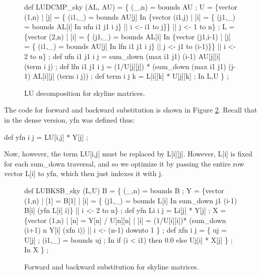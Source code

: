 \begin{figure}[htbp]
 \hdivider
\begin{idenv}
def LUDCMP\_sky (AL, AU) =
    \{ (\_,n) = bounds AU ;
\null
      U = \{vector (1,n)
           | [j] = \{ (i1,\_) = bounds  AU[j]
                    In
                      \{vector (i1,j)
                       | [i] = \{ (j1,\_) = bounds  AL[i]
                                In
                                  ufn i1 j1 i j\}       || i <- i1 to j\}\}
                                                          || j <- 1 to n\} ;
\null
      L = \{vector (2,n)
           | [i] = \{ (j1,\_) = bounds  AL[i]
                    In
                      \{vector (j1,i-1)
                       | [j] = \{ (i1,\_) = bounds  AU[j]
                                In
                                  lfn i1 j1 i j\}       || j <- j1 to (i-1)\}\}
                                                          || i <- 2 to n\} ;
\null
      def ufn i1 j1 i j = sum\_down  (max i1 j1)  (i-1)  AU[j][i]  (term i j) ;
\null
      def lfn i1 j1 i j = (1/U[j][j]) *
                          (sum\_down  (max i1 j1)  (j-1)  AL[i][j]  (term i j)) ;
\null
      def term i j k = L[i][k] * U[j][k] ;
    In
      L,U \} ;
\end{idenv}
 \caption{%
    \label{ludcmp-sky-program}
    LU decomposition for skyline matrices.
         }
 \hdivider
\end{figure}

The code for forward and backward substitution is shown in Figure
\ref{lubksb-sky-program}. Recall that in the dense version, {\cf yfn} was defined thus:

\beginid
    def yfn i j = LU[i,j] * Y[j] ;
\endid

Now, however, the term {\cf LU[i,j]} must be replaced by {\cf
L[i][j]}.  However, {\cf L[i]} is fixed for each {\cf sum\_down}
traversal, and so we optimize it by passing the entire row vector {\cf
L[i]} to {\cf yfn}, which then just indexes it with {\cf j}.

\begin{figure}[htbp]
 \hdivider
\begin{idenv}
def LUBKSB\_sky (L,U) B =
  \{ (\_,n) = bounds B ;
\null
    Y = \{vector (1,n)
         | [1] = B[1]
         | [i] = \{ (j1,\_) = bounds  L[i]
                  In
                    sum\_down j1 (i-1) B[i] (yfn L[i] i)\} || i <- 2 to n\} ;
\null
    def yfn Li i j = Li[j] * Y[j] ;
\null
    X = \{vector (1,n)
         | [n] = Y[n]  / U[n][n]
         | [i] = (1/U[i][i])*
                 (sum\_down (i+1) n Y[i] (xfn i)) || i <- (n-1) downto 1 \} ;
\null
    def xfn i j = \{ uj = U[j] ;
                    (i1,\_) = bounds uj ;
                   In
                     if (i < i1) then
                       0.0
                     else
                       Uj[i] * X[j] \} ;
   In
     X \} ;
\end{idenv}
 \caption{%
    \label{lubksb-sky-program}
    Forward and backward substitution for skyline matrices.
         }
 \hdivider
\end{figure}


